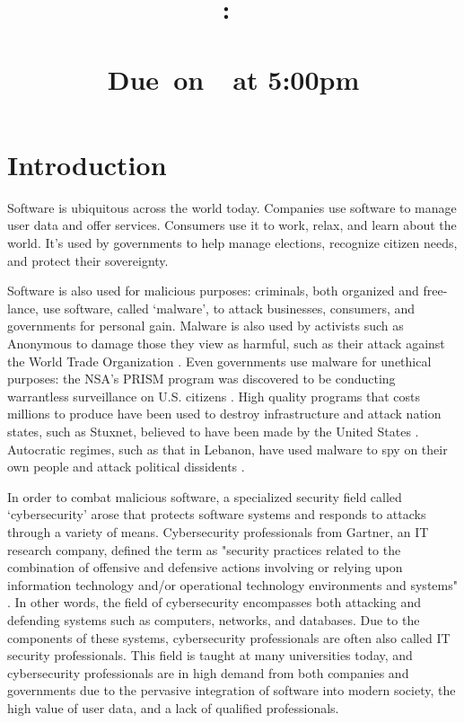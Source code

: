 \documentclass[openright]{report}
\title{
    \vspace{2in}
    \LARGE{\textbf{\projectTitle}}\\
    \vspace{0.1in}\large{\reportClass:\ \reportTopic}\\
    \vspace{0.1in}\large{\reportClassInstructor}\\
    \normalsize\vspace{0.1in}\large{Due\ on\ \reportDueDate\ at 5:00pm}
    \vspace{1.4in}
}
\author{\reportAuthorName}
\date{}
\begin{document}
\maketitle

\large{\tableofcontents}

\chapter{Introduction}

\par Software is ubiquitous across the world today. Companies use software to manage user data and offer services. Consumers use it to work, relax, and learn about the world. It's used by governments to help manage elections, recognize citizen needs, and protect their sovereignty. 

\par Software is also used for malicious purposes: criminals, both organized and free-lance, use software, called `malware', to attack businesses, consumers, and governments for personal gain. Malware is also used by activists such as Anonymous to damage those they view as harmful, such as their attack against the World Trade Organization \cite{anonymous_attack}. Even governments use malware for unethical purposes: the NSA's PRISM program was discovered to be conducting warrantless surveillance on U.S. citizens \cite{nsa_illegal}. High quality programs that costs millions to produce have been used to destroy infrastructure and attack nation states, such as Stuxnet, believed to have been made by the United States \cite{stuxnet}. Autocratic regimes, such as that in Lebanon, have used malware to spy on their own people and attack political dissidents \cite{lebanon}.

\par In order to combat malicious software, a specialized security field called `cybersecurity' arose that protects software systems and responds to attacks through a variety of means. Cybersecurity professionals from Gartner, an IT research company, defined the term as "security practices related to the combination of offensive and defensive actions involving or relying upon information technology and/or operational technology environments and systems" \cite{cyber_def}. In other words, the field of cybersecurity encompasses both attacking and defending systems such as computers, networks, and databases. Due to the components of these systems, cybersecurity professionals are often also called IT security professionals. This field is taught at many universities today, and cybersecurity professionals are in high demand from both companies and governments due to the pervasive integration of software into modern society, the high value of user data, and a lack of qualified professionals.
\end{document}

